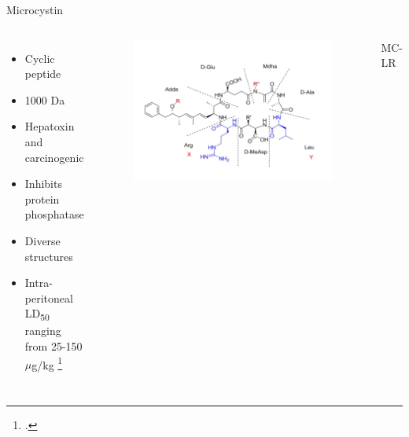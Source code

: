 \begin{frame}{Microcystin}

\begin{columns}

	\begin{itemize}
		\item Cyclic peptide
		\item 1000 Da
		\item Hepatoxin and carcinogenic
		\item Inhibits protein phosphatase
		\item Diverse structures 
		\item Intra-peritoneal LD\textsubscript{50} ranging from 25-150 $\mu$g/kg  \footcite{dittmann_cyanobacterial_2012}

	\end{itemize}

\begin{figure}
	\centering
	\hspace*{-3cm}
	\includegraphics[scale=0.2]{../figures/Microcystin-LR.png}
\end{figure}
MC-LR
\end{columns}

\end{frame}
